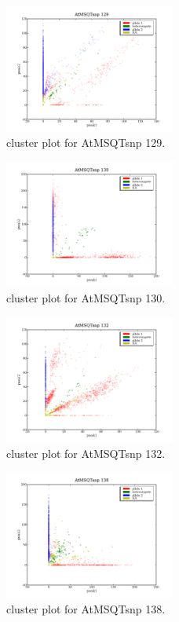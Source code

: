 \begin{figure}[H]
\includegraphics[width=0.5\textwidth]{figures/cluster_plot_AtMSQTsnp_129.png}
\caption{cluster plot for AtMSQTsnp 129.} \label{flAtMSQTsnp129}
\end{figure}

\begin{figure}[H]
\includegraphics[width=0.5\textwidth]{figures/cluster_plot_AtMSQTsnp_130.png}
\caption{cluster plot for AtMSQTsnp 130.} \label{flAtMSQTsnp130}
\end{figure}

\begin{figure}[H]
\includegraphics[width=0.5\textwidth]{figures/cluster_plot_AtMSQTsnp_132.png}
\caption{cluster plot for AtMSQTsnp 132.} \label{flAtMSQTsnp132}
\end{figure}

\begin{figure}[H]
\includegraphics[width=0.5\textwidth]{figures/cluster_plot_AtMSQTsnp_138.png}
\caption{cluster plot for AtMSQTsnp 138.} \label{flAtMSQTsnp138}
\end{figure}

